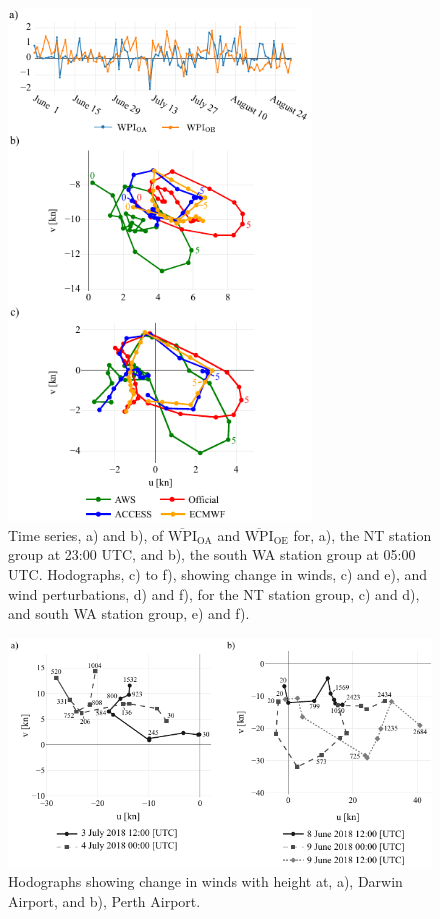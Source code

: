 \documentclass{ametsoc}
\begin{document}
\begin{figure}
\centering
\includegraphics[width=19pc]{case_studies_wa.pdf}
\caption{Time series, a) and b), of $\overline{\text{WPI}}_\text{OA}$ and $\overline{\text{WPI}}_\text{OE}$ for, a), the NT station group at 23:00 UTC, and b), the south WA station group at 05:00 UTC. Hodographs, c) to f), showing change in winds, c) and e), and wind perturbations, d) and f), for the NT station group, c) and d), and south WA station group, e) and f).}
\label{Fig:case_studies_wa}
\end{figure}

\begin{figure}
\centering
\includegraphics[width=33pc]{perth_sounding.pdf}
\caption{Hodographs showing change in winds with height at, a), Darwin Airport, and b), Perth Airport.}
\label{Fig:perth_sounding}
\end{figure}
\end{document}
